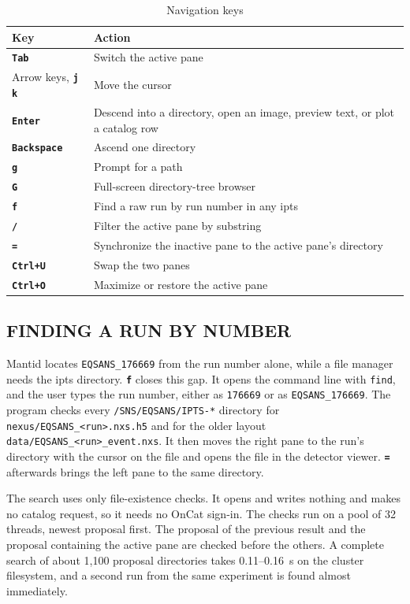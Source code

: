 \documentclass[tm]{ornltm}
\newcommand{\key}[1]{\textbf{\texttt{#1}}}
\begin{document}
\begin{table}[ht]
  \centering
  \caption{Navigation keys}
  \label{tab:nav}
  \small
  \begin{tabular}{l l}
    \toprule
    Key & Action \\
    \midrule
    \key{Tab} & Switch the active pane \\
    Arrow keys, \key{j} \key{k} & Move the cursor \\
    \key{Enter} & Descend into a directory, open an image, preview text, or plot
      a catalog row \\
    \key{Backspace} & Ascend one directory \\
    \key{g} & Prompt for a path \\
    \key{G} & Full-screen directory-tree browser \\
    \key{f} & Find a raw run by run number in any \ac{ipts} \\
    \key{/} & Filter the active pane by substring \\
    \key{=} & Synchronize the inactive pane to the active pane's directory \\
    \key{Ctrl+U} & Swap the two panes \\
    \key{Ctrl+O} & Maximize or restore the active pane \\
    \bottomrule
  \end{tabular}
\end{table}

\subsection{FINDING A RUN BY NUMBER}
\label{sec:runfind}

Mantid locates \texttt{EQSANS\_176669} from the run number alone, while a file
manager needs the \ac{ipts} directory. \key{f} closes this gap. It opens the
command line with \texttt{find}, and the user types the run number, either as
\texttt{176669} or as \texttt{EQSANS\_176669}. The program checks every
\texttt{/SNS/EQSANS/IPTS-*} directory for
\texttt{nexus/EQSANS\_<run>.nxs.h5} and for the older layout
\texttt{data/EQSANS\_<run>\_event.nxs}. It then moves the right pane to the
run's directory with the cursor on the file and opens the file in the detector
viewer. \key{=} afterwards brings the left pane to the same directory.

The search uses only file-existence checks. It opens and writes nothing and
makes no catalog request, so it needs no OnCat sign-in. The checks run on a
pool of 32 threads, newest proposal first. The proposal of the previous result
and the proposal containing the active pane are checked before the others. A
complete search of about 1,100 proposal directories takes 0.11--0.16~s on the
cluster filesystem, and a second run from the same experiment is found almost
immediately.
\end{document}
